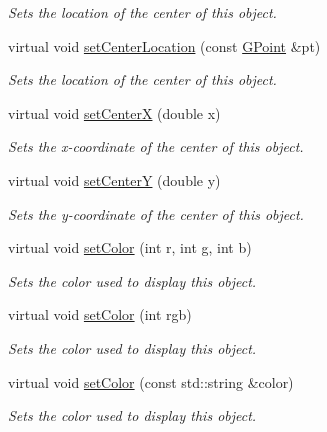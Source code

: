 \begin{DoxyCompactItemize}
\begin{DoxyCompactList}\small\item\em Sets the location of the center of this object. \end{DoxyCompactList}\item 
virtual void \mbox{\hyperlink{classsgl_1_1GObject_a1bedf1b233ecba3f753ec58908a683a6}{set\+Center\+Location}} (const \mbox{\hyperlink{structsgl_1_1GPoint}{G\+Point}} \&pt)
\begin{DoxyCompactList}\small\item\em Sets the location of the center of this object. \end{DoxyCompactList}\item 
virtual void \mbox{\hyperlink{classsgl_1_1GObject_a2f4936281e056eead00a9186b9ba8af6}{set\+CenterX}} (double x)
\begin{DoxyCompactList}\small\item\em Sets the x-\/coordinate of the center of this object. \end{DoxyCompactList}\item 
virtual void \mbox{\hyperlink{classsgl_1_1GObject_aad2a22b4fde88c33306b92aebf641d57}{set\+CenterY}} (double y)
\begin{DoxyCompactList}\small\item\em Sets the y-\/coordinate of the center of this object. \end{DoxyCompactList}\item 
virtual void \mbox{\hyperlink{classsgl_1_1GObject_ad57ef49bc31db94e92648aa3737923d6}{set\+Color}} (int r, int g, int b)
\begin{DoxyCompactList}\small\item\em Sets the color used to display this object. \end{DoxyCompactList}\item 
virtual void \mbox{\hyperlink{classsgl_1_1GObject_ab1f5cc0f5cc6bbbd716a526c61f1081d}{set\+Color}} (int rgb)
\begin{DoxyCompactList}\small\item\em Sets the color used to display this object. \end{DoxyCompactList}\item 
virtual void \mbox{\hyperlink{classsgl_1_1GObject_a61374df6c11b52cfbb0815decdbaebc6}{set\+Color}} (const std\+::string \&color)
\begin{DoxyCompactList}\small\item\em Sets the color used to display this object. \end{DoxyCompactList}\item 

\end{DoxyCompactItemize}
